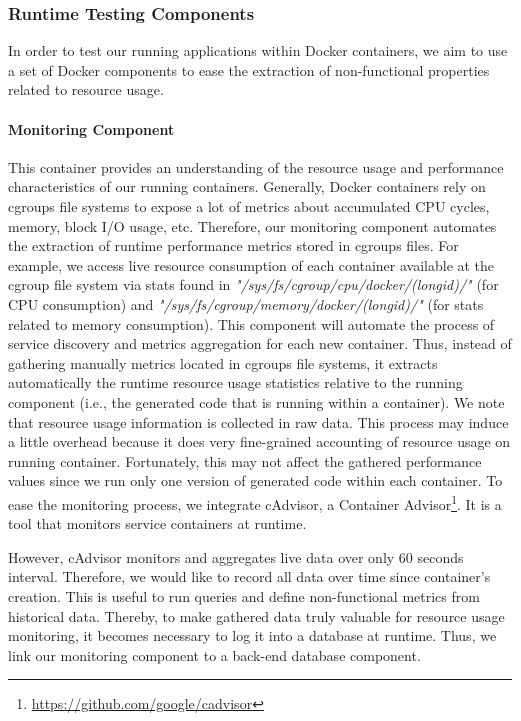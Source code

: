 \subsubsection{Runtime Testing Components}
In order to test our running applications within Docker containers, we aim to use a set of Docker components to ease the extraction of non-functional properties related to resource usage.
\paragraph{Monitoring Component}
This container provides an understanding of the resource usage and performance characteristics of our running containers. Generally, Docker containers rely on cgroups file systems to expose a lot of metrics about accumulated CPU cycles, memory, block I/O usage, etc. Therefore, our monitoring component automates the extraction of runtime performance metrics stored in cgroups files. For example, we access live resource consumption of each container available at the cgroup file system via stats found in \textit{"/sys/fs/cgroup/cpu/docker/(longid)/"} (for CPU consumption) and \textit{"/sys/fs/cgroup/memory/docker/(longid)/"} (for stats related to memory consumption). This component will automate the process of service discovery and metrics aggregation for each new container. Thus, instead of gathering manually metrics located in cgroups file systems, it extracts automatically the runtime resource usage statistics relative to the running component (i.e., the generated code that is running within a container). We note that resource usage information is collected in raw data. This process may induce a little overhead because it does very fine-grained accounting of resource usage on running container. Fortunately, this may not affect the gathered performance values since we run only one version of generated code within each container.
To ease the monitoring process, we integrate cAdvisor, a Container Advisor\footnote{\url{https://github.com/google/cadvisor}}. It is a tool that monitors service containers at runtime. 

However, cAdvisor monitors and aggregates live data over only 60 seconds interval. Therefore, we would like to record all data over time since container's creation. This is useful to run queries and define non-functional metrics from historical data. Thereby, to make gathered data truly valuable for resource usage monitoring, it becomes necessary to log it into a database at runtime. Thus, we link our monitoring component to a back-end database component. 



